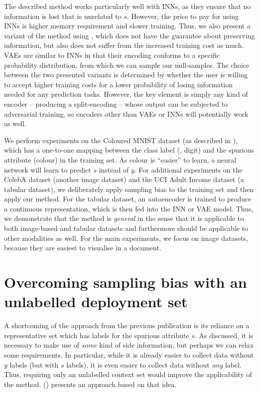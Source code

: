 The described method works particularly well with \acp{INN},
as they ensure that no information is lost that is unrelated to \(s\).
However, the price to pay for using \acp{INN} is higher memory requirement and slower training.
Thus, we also present a variant of the method using ,
which does not have the guarantee about preserving information,
but also does not suffer from the increased training cost as much.
\acp{VAE} are similar to \acp{INN}
in that their encoding conforms to a specific probability distribution,
from which we can sample our null-samples.
The choice between the two presented variants is determined
by whether the user is willing to accept higher training costs
for a lower probability of losing information needed for any prediction tasks.
However, the key element is simply any kind of encoder -- producing a split-encoding --
whose output can be subjected to adversarial training,
so encoders other than \acp{VAE} or \acp{INN} will potentially work as well.

We perform experiments on the Coloured MNIST dataset (as described in ),
which has a one-to-one mapping between the class label (\ie, digit) and the spurious attribute (colour)
in the training set.
As colour is ``easier'' to learn, a neural network will learn to predict \(s\) instead of \(y\).
For additional experiments on the CelebA dataset (another image dataset)
and the UCI Adult Income dataset (a tabular dataset),
we deliberately apply sampling bias to the training set and then apply our method.
For the tabular dataset, an autoencoder is trained to produce a continuous representation,
which is then fed into the \ac{INN} or \ac{VAE} model.
Thus, we demonstrate that the method is \emph{general}
in the sense that it is applicable to both image-based and tabular datasets
and furthermore should be applicable to other modalities as well.
For the main experiments, we focus on image datasets,
because they are easiest to visualise in a document.

\section{Overcoming sampling bias with an unlabelled deployment set}\label{sec:zsf}
A shortcoming of the approach from the previous publication \citep{kehrenberg2020nullsampling}
is its reliance on a representative set which has labels for the spurious attribute \(s\).
As discussed, it is necessary to make use of \emph{some} kind of side information,
but perhaps we can relax some requirements.
In particular, while it is already easier to collect data without \(y\) labels (but with \(s\) labels),
it is even easier to collect data without \emph{any} label.
Thus, requiring only an unlabelled context set would improve the applicability of the method.
\citet{kehrenberg2020zeroshot} () presents an approach based on that idea.

